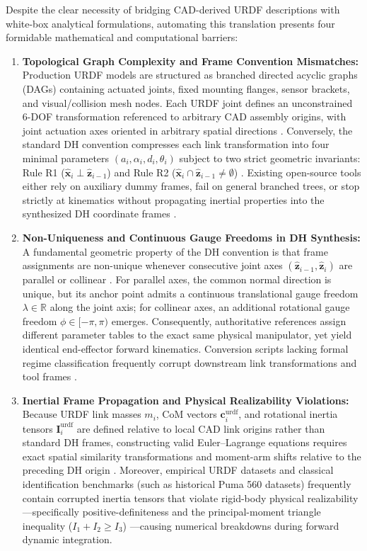 \documentclass[fleqn,10pt]{article}
\begin{document}
	Despite the clear necessity of bridging CAD-derived URDF descriptions with white-box analytical formulations, automating this translation presents four formidable mathematical and computational barriers:
	\begin{enumerate}
		\item \textbf{Topological Graph Complexity and Frame Convention Mismatches:} Production URDF models \cite{tola2024understanding} are structured as branched directed acyclic graphs (DAGs) containing actuated joints, fixed mounting flanges, sensor brackets, and visual/collision mesh nodes. Each URDF joint defines an unconstrained 6-DOF transformation referenced to arbitrary CAD assembly origins, with joint actuation axes oriented in arbitrary spatial directions \cite{yu2024unified, ihab2026urdf2dt}. Conversely, the standard DH convention compresses each link transformation into four minimal parameters $(a_i, \alpha_i, d_i, \theta_i)$ subject to two strict geometric invariants: Rule R1 ($\hat{\bm{x}}_i \perp \hat{\bm{z}}_{i-1}$) and Rule R2 ($\hat{\bm{x}}_i \cap \hat{\bm{z}}_{i-1} \neq \emptyset$) \cite{denavit1955kinematic, craig2005introduction}. Existing open-source tools \cite{trzy2020urdf, cursi2021urdfgen} either rely on auxiliary dummy frames, fail on general branched trees, or stop strictly at kinematics without propagating inertial properties into the synthesized DH coordinate frames \cite{ihab2026urdf2dt}.
		\item \textbf{Non-Uniqueness and Continuous Gauge Freedoms in DH Synthesis:} A fundamental geometric property of the DH convention is that frame assignments are non-unique whenever consecutive joint axes $(\hat{\bm{z}}_{i-1}, \hat{\bm{z}}_i)$ are parallel or collinear \cite{ihab2026urdf2dt, yu2024unified}. For parallel axes, the common normal direction is unique, but its anchor point admits a continuous translational gauge freedom $\lambda \in \mathbb{R}$ along the joint axis; for collinear axes, an additional rotational gauge freedom $\phi \in [-\pi, \pi)$ emerges. Consequently, authoritative references \cite{craig2005introduction, spong2020robot} assign different parameter tables to the exact same physical manipulator, yet yield identical end-effector forward kinematics. Conversion scripts lacking formal regime classification frequently corrupt downstream link transformations and tool frames \cite{abdelrahman2026urdf2dt}.
		\item \textbf{Inertial Frame Propagation and Physical Realizability Violations:} Because URDF link masses $m_i$, CoM vectors $\bm{c}_i^{\text{urdf}}$, and rotational inertia tensors $\bm{I}_i^{\text{urdf}}$ are defined relative to local CAD link origins rather than standard DH frames, constructing valid Euler--Lagrange equations requires exact spatial similarity transformations and moment-arm shifts relative to the preceding DH origin \cite{ihab2026urdf2dt, asr2026calibration}. Moreover, empirical URDF datasets and classical identification benchmarks (such as historical Puma 560 datasets) frequently contain corrupted inertia tensors that violate rigid-body physical realizability---specifically positive-definiteness and the principal-moment triangle inequality ($I_1 + I_2 \ge I_3$) \cite{sousa2019physical, tola2024understanding}---causing numerical breakdowns during forward dynamic integration.

\end{enumerate}
\end{document}
